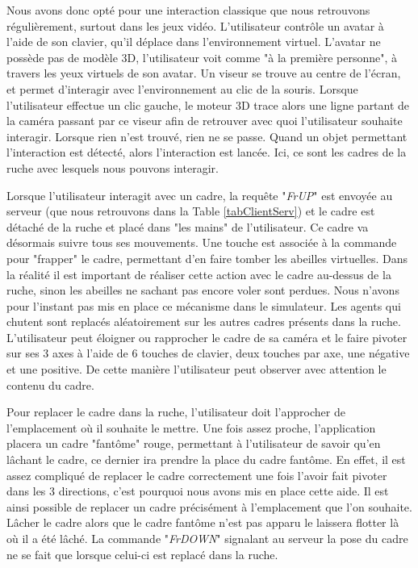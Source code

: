 		Nous avons donc opté pour une interaction classique que nous retrouvons régulièrement, surtout dans les jeux vidéo. L'utilisateur contrôle un avatar à l'aide de son clavier, qu'il déplace dans l'environnement virtuel. L'avatar ne possède pas de modèle 3D, l'utilisateur voit comme "à la première personne", à travers les yeux virtuels de son avatar. Un viseur se trouve au centre de l'écran, et permet d'interagir avec l'environnement au clic de la souris. Lorsque l'utilisateur effectue un clic gauche, le moteur 3D trace alors une ligne partant de la caméra passant par ce viseur afin de retrouver avec quoi l'utilisateur souhaite interagir. Lorsque rien n'est trouvé, rien ne se passe. Quand un objet permettant l'interaction est détecté, alors l'interaction est lancée. Ici, ce sont les cadres de la ruche avec lesquels nous pouvons interagir.
		
		Lorsque l'utilisateur interagit avec un cadre, la requête "\textit{FrUP}" est envoyée au serveur (que nous retrouvons dans la Table \ref{tabClientServ}) et le cadre est détaché de la ruche et placé dans "les mains" de l'utilisateur. Ce cadre va désormais suivre tous ses mouvements. Une touche est associée à la commande pour "frapper" le cadre, permettant d'en faire tomber les abeilles virtuelles. Dans la réalité il est important de réaliser cette action avec le cadre au-dessus de la ruche, sinon les abeilles ne sachant pas encore voler sont perdues. Nous n'avons pour l'instant pas mis en place ce mécanisme dans le simulateur. Les agents qui chutent sont replacés aléatoirement sur les autres cadres présents dans la ruche.
		L'utilisateur peut éloigner ou rapprocher le cadre de sa caméra et le faire pivoter sur ses 3 axes à l'aide de 6 touches de clavier, deux touches par axe, une négative et une positive. De cette manière l'utilisateur peut observer avec attention le contenu du cadre.
		
		Pour replacer le cadre dans la ruche, l'utilisateur doit l'approcher de l'emplacement où il souhaite le mettre. Une fois assez proche, l'application placera un cadre "fantôme" rouge, permettant à l'utilisateur de savoir qu'en lâchant le cadre, ce dernier ira prendre la place du cadre fantôme. En effet, il est assez compliqué de replacer le cadre correctement une fois l'avoir fait pivoter dans les 3 directions, c'est pourquoi nous avons mis en place cette aide. Il est ainsi possible de replacer un cadre précisément à l'emplacement que l'on souhaite. Lâcher le cadre alors que le cadre fantôme n'est pas apparu le laissera flotter là où il a été lâché. La commande "\textit{FrDOWN}" signalant au serveur la pose du cadre ne se fait que lorsque celui-ci est replacé dans la ruche.
		
